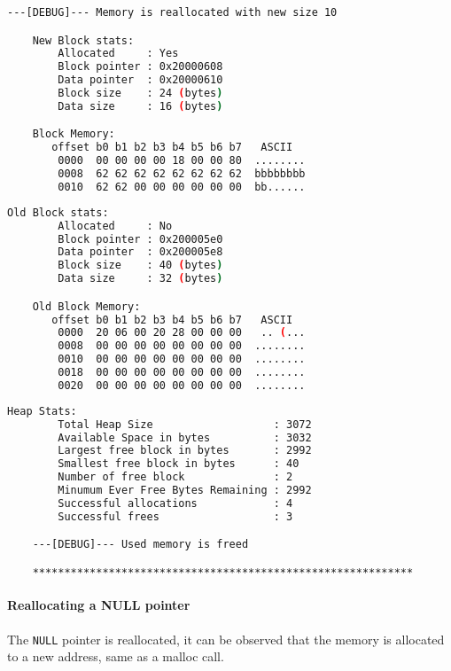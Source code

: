     \begin{outputbox}
    \begin{lstlisting}[language=bash]
    ---[DEBUG]--- Memory is reallocated with new size 10

    New Block stats:
        Allocated     : Yes
        Block pointer : 0x20000608
        Data pointer  : 0x20000610
        Block size    : 24 (bytes)
        Data size     : 16 (bytes)

    Block Memory:
       offset b0 b1 b2 b3 b4 b5 b6 b7   ASCII
        0000  00 00 00 00 18 00 00 80  ........
        0008  62 62 62 62 62 62 62 62  bbbbbbbb
        0010  62 62 00 00 00 00 00 00  bb......
    \end{lstlisting}
    \end{outputbox}

    \begin{outputbox}
    \begin{lstlisting}[language=bash]
    Old Block stats:
        Allocated     : No
        Block pointer : 0x200005e0
        Data pointer  : 0x200005e8
        Block size    : 40 (bytes)
        Data size     : 32 (bytes)

    Old Block Memory:
       offset b0 b1 b2 b3 b4 b5 b6 b7   ASCII
        0000  20 06 00 20 28 00 00 00   .. (...
        0008  00 00 00 00 00 00 00 00  ........
        0010  00 00 00 00 00 00 00 00  ........
        0018  00 00 00 00 00 00 00 00  ........
        0020  00 00 00 00 00 00 00 00  ........
    \end{lstlisting}
    \end{outputbox}

    \begin{outputbox}
    \begin{lstlisting}[language=bash]
    Heap Stats:
        Total Heap Size                   : 3072
        Available Space in bytes          : 3032
        Largest free block in bytes       : 2992
        Smallest free block in bytes      : 40
        Number of free block              : 2
        Minumum Ever Free Bytes Remaining : 2992
        Successful allocations            : 4
        Successful frees                  : 3

    ---[DEBUG]--- Used memory is freed

    ************************************************************
    \end{lstlisting}
    \end{outputbox}

    \paragraph{Reallocating a NULL pointer}
    The \texttt{NULL} pointer is reallocated, it can be observed that the memory is allocated to a new address, same as a malloc call.

